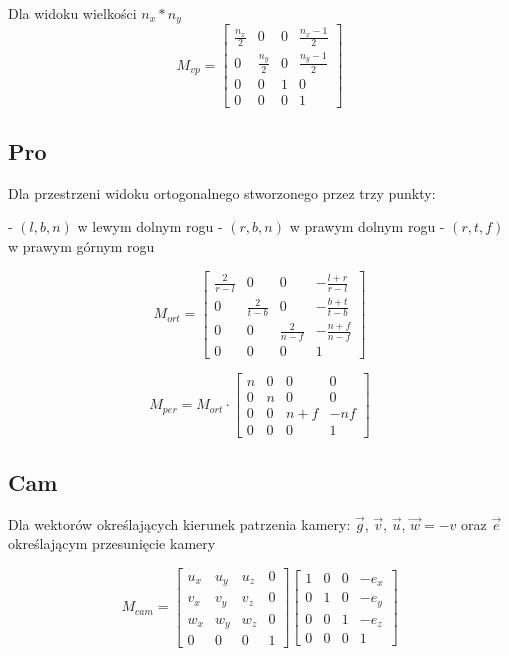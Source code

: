 \documentclass{../notatki}
\begin{document}
Dla widoku wielkości $n_x * n_y$
$$
M_{vp} =
\begin{bmatrix}
  \frac{n_x}{2} & 0 & 0 & \frac{n_x - 1}{2} \\
  0 & \frac{n_y}{2} & 0 & \frac{n_y - 1}{2} \\
  0 & 0 & 1 & 0 \\
  0 & 0 & 0 & 1
\end{bmatrix}
$$

\subsection{Pro}

Dla przestrzeni widoku ortogonalnego stworzonego przez trzy punkty:

- $(l,b,n)$ w lewym dolnym rogu
- $(r,b,n)$ w prawym dolnym rogu
- $(r,t,f)$ w prawym górnym rogu

$$
M_{ort} =
\begin{bmatrix}
  \frac{2}{r - l} & 0 & 0 & -\frac{l + r}{r - l} \\
  0 & \frac{2}{t - b} & 0 & -\frac{b + t}{t - b} \\
  0 & 0 & \frac{2}{n - f} & -\frac{n + f}{n - f} \\
  0 & 0 & 0 & 1
\end{bmatrix}
$$

$$
M_{per} = M_{ort} \cdot
\begin{bmatrix}
  n & 0 & 0 & 0 \\
  0 & n & 0 & 0 \\
  0 & 0 & n + f & -nf \\
  0 & 0 & 0 & 1
\end{bmatrix}
$$

\subsection{Cam}

Dla wektorów określających kierunek patrzenia kamery: $\vec{g}$,
$\vec{v}$, $\vec{u}$, $\vec{w} = -v$ oraz $\vec{e}$ określającym
przesunięcie kamery

$$
M_{cam} =
\begin{bmatrix}
  u_x & u_y & u_z & 0 \\
  v_x & v_y & v_z & 0 \\
  w_x & w_y & w_z & 0 \\
  0 & 0 & 0 & 1
\end{bmatrix}
\begin{bmatrix}
  1 & 0 & 0 & -e_x \\
  0 & 1 & 0 & -e_y \\
  0 & 0 & 1 & -e_z \\
  0 & 0 & 0 & 1
\end{bmatrix}
$$
\end{document}
